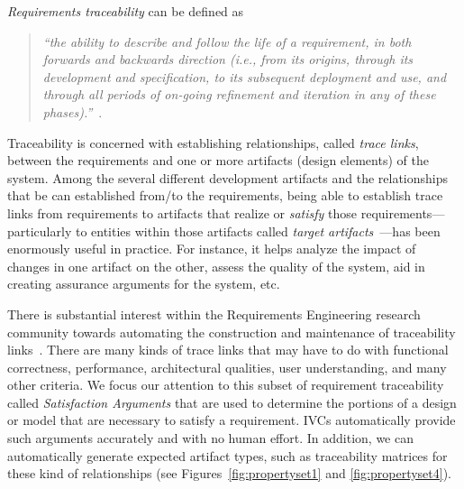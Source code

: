\emph{Requirements traceability} can be defined as \\
\begin{quotation}
\textit{``the ability to describe and follow the life of a requirement, in both forwards and backwards direction (i.e., from its origins, through its development and specification, to its subsequent deployment and use, and through all periods of on-going refinement and iteration in any of these phases).''}~\cite{gotel}. \\
\end{quotation}


Traceability is concerned with establishing relationships, called \emph{trace links}, between the requirements and one or more artifacts (design elements) of the system.
Among the several different development artifacts and the relationships that be can established from/to the requirements, being able to establish trace links from requirements to artifacts that realize or \emph{satisfy} those requirements---particularly to entities within those artifacts called \emph{target artifacts}~\cite{gotel2012traceability}---has been enormously useful in practice.
For instance, it helps analyze the impact of changes in one artifact on the other, assess the quality of the system, aid in creating assurance arguments for the system, etc.

There is substantial interest within the Requirements Engineering research community towards automating the construction and maintenance of traceability links~\cite{hayes2003improving, egyed2002automating,cleland2007best}.
There are many kinds of trace links that may have to do with functional correctness, performance, architectural qualities, user understanding, and many other criteria.
%
%
We focus our attention to this subset of requirement traceability called {\em Satisfaction Arguments} that are used to determine the portions of a design or model that are necessary to satisfy a requirement.  IVCs automatically provide such arguments accurately and with no human effort.  In addition, we can automatically generate expected artifact types, such as traceability matrices for these kind of relationships (see Figures~\ref{fig:propertyset1} and \ref{fig:propertyset4}).

